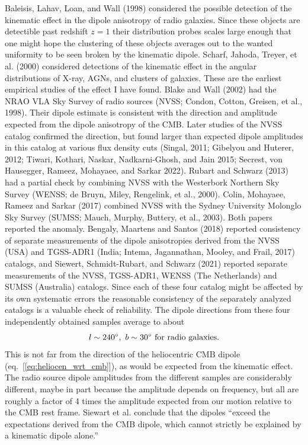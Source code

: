 \documentclass[fleqn,usenatbib]{mnras}
\newcommand{\beq}{\begin{equation}}
\newcommand{\eeq}{\end{equation}}
\begin{document}
Baleisis, Lahav, Loan, and Wall (1998) considered the possible detection of the kinematic  effect in the dipole anisotropy of radio galaxies. Since these objects are detectible past redshift $z=1$ their distribution probes scales large enough that one might hope the clustering of these objects averages out to the wanted uniformity to be seen broken by the kinematic dipole. Scharf, Jahoda, Treyer, et al. (2000) considered detections of the kinematic effect in the angular distributions of X-ray, AGNs, and clusters of galaxies. These are the earliest empirical studies of the effect I have found. Blake and Wall (2002) had the NRAO VLA Sky Survey of radio sources (NVSS; Condon, Cotton, Greisen, et al., 1998).  Their dipole estimate is consistent with the direction and amplitude expected from the dipole anisotropy of the CMB. Later studies of the NVSS catalog confirmed the direction, but found larger than expected dipole amplitudes in this catalog at various flux density cuts (Singal, 2011; Gibelyou and Huterer, 2012; Tiwari, Kothari, Naskar, Nadkarni-Ghosh, and Jain 2015; Secrest, von Hausegger, Rameez, Mohayaee, and Sarkar 2022). Rubart and Schwarz (2013) had a partial check by combining NVSS with the Westerbork Northern Sky Survey (WENSS; de Bruyn, Miley, Rengelink, et al., 2000). Colin, Mohayaee, Rameez and Sarkar (2017) combined NVSS with the Sydney University Molonglo Sky Survey (SUMSS; Mauch, Murphy, Buttery, et al., 2003). Both papers reported the anomaly. Bengaly, Maartens and Santos (2018) reported consistency of separate measurements of the dipole anisotropies derived from the NVSS (USA) and TGSS-ADR1 (India; Intema, Jagannathan, Mooley, and Frail, 2017) catalogs, and  Siewert, Schmidt-Rubart, and Schwarz (2021) reported separate measurements of the NVSS, TGSS-ADR1, WENSS (The Netherlands) and SUMSS (Australia) catalogs. Since each of these four catalog might be affected by its own systematic errors the reasonable consistency of the separately analyzed catalogs is a valuable check of reliability. The dipole directions from these four independently obtained samples average to about 
\beq
l\sim 240^\circ,\ b\sim 30^\circ\hbox{ for radio galaxies.}\label{eq:radiodipole}
\eeq
This is not far from the direction of the heliocentric CMB dipole (eq.~[\ref{eq:heliocen_wrt_cmb}]), as would be expected from the kinematic effect. The radio source dipole amplitudes from the different samples are considerably different, maybe in part  because the amplitude depends on frequency, but all are roughly a factor of 4 times the amplitude expected from our motion relative to the CMB rest frame. Siewart et al. conclude that the dipoles ``exceed the expectations derived from the CMB dipole, which cannot strictly be explained by a kinematic dipole alone.'' 
\end{document}
